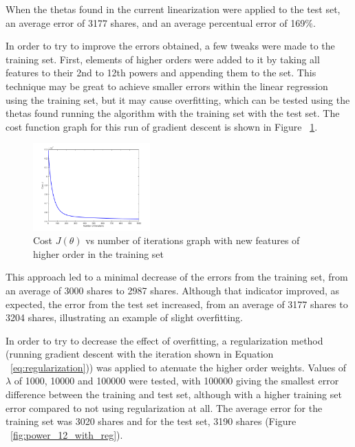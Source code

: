 \documentclass[10pt,twocolumn,letterpaper]{article}
\begin{document}
When the thetas found in the current linearization were applied to the test set, an average error of 3177 shares, and an average percentual error of 169$\%$.

In order to try to improve the errors obtained, a few tweaks were made to the training set. First, elements of higher orders were added to it by taking all features to their 2nd to 12th powers and appending them to the set. This technique may be great to achieve smaller errors within the linear regression using the training set, but it may cause overfitting, which can be tested using the thetas found running the algorithm with the training set with the test set. The cost function graph for this run of gradient descent is shown in Figure ~\ref{fig:second_run_label}.

\begin{figure}[H]
\begin{center}
	\includegraphics[width=0.4\textwidth]{pics/power_12_wo_reg}
	\caption{Cost $J(\theta)$ vs number of iterations graph with new features of higher order in the training set\label{fig:second_run_label}}
\end{center} 
\end{figure}   

This approach led to a minimal decrease of the errors from the training set, from an average of 3000 shares to 2987 shares. Although that indicator improved, as expected, the error from the test set increased, from an average of 3177 shares to 3204 shares, illustrating an example of slight overfitting. 

In order to try to decrease the effect of overfitting, a regularization method (running gradient descent with the iteration shown in Equation ~\ref{eq:regularization})) was applied to atenuate the higher order weights. Values of $\lambda$ of 1000, 10000 and 100000 were tested, with 100000 giving the smallest error difference between the training and test set, although with a higher training set error compared to not using regularization at all. The average error for the training set was 3020 shares and for the test set, 3190 shares (Figure ~\ref{fig:power_12_with_reg}).
\end{document}
